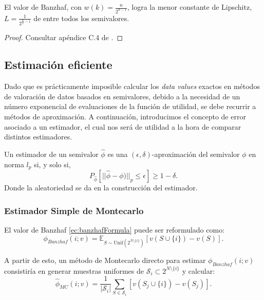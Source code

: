 \begin{theorem}
  El valor de Banzhaf, con $w(k) = \frac{n}{2^{n-1}}$, logra
  la menor constante de Lipschitz,
  $L = \frac{1}{2^{\frac{n}{2}-1}}$ de entre todos los semivalores.
\end{theorem}

\begin{proof}
  Consultar apéndice C.4 de \cite{dataBanzhaf}.
\end{proof}


\subsection{Estimación eficiente}

Dado que es prácticamente imposible calcular los
\textit{data values} exactos en métodos de valoración
de datos basados en semivalores, debido a la necesidad
de un número exponencial de evaluaciones de la función
de utilidad, se debe recurrir a métodos de aproximación.
A continuación, introducimos el concepto de error
asociado a un estimador, el cual nos será de utilidad
a la hora de comparar distintos estimadores.

\begin{definition}
  Un estimador de un semivalor $\hat{\phi}$ es
  una $(\epsilon,\delta)$-aproximación del semivalor $\phi$ 
  en norma $l_p$ si, y solo si,
  \[
  P_{\hat{\phi}}[||\hat{\phi}-\phi)||_p\leq \epsilon] \geq 1-\delta.
  \]
  Donde la aleatoriedad se da en la construcción del estimador.
\end{definition}

\subsubsection*{Estimador Simple de Montecarlo}
El valor de Banzhaf \ref{ec:banzhafFormula}
puede ser reformulado como:
\begin{equation*}
  \label{simpleMontecarlo}
  \phi_{Banzhaf}(i;v) = \mathbb{E}_{S \sim \text{Unif}
  (2^{N\setminus \{i\}})} [v(S \cup \{i\})-v(S)].
\end{equation*}

A partir de esto, un método de Montecarlo directo
para estimar $\phi_{Banzhaf}(i;v)$ consistiría en
generar muestras uniformes de $\mathcal{S}_i
\subset 2^{N \setminus \{i\}}$ y calcular:
\begin{equation}
  \label{ec:simpleMontecarloEstimator}
  \hat{\phi}_{MC}(i;v) = \frac{1}{|\mathcal{S}_i|}\sum_{S \in
  \mathcal{S}_i} [v(S_j \cup \{i\})-v(S_j)].
\end{equation}

